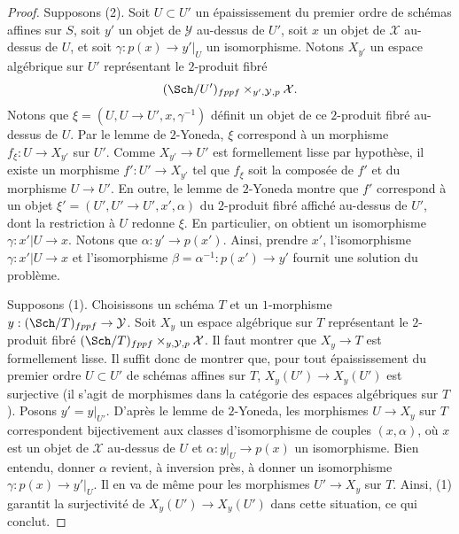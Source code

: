 \begin{proof}
Supposons (2). Soit $U \subset U'$ un épaississement du premier ordre
de schémas affines sur $S$, soit $y'$ un objet de $\mathcal{Y}$
au-dessus de $U'$, soit $x$ un objet de $\mathcal{X}$ au-dessus de $U$,
et soit $\gamma : p(x) \to y'|_U$ un isomorphisme. Notons
$X_{y'}$ un espace algébrique sur $U'$ représentant le $2$-produit
fibré
$$
(\Sch/U')_{fppf} \times_{y', \mathcal{Y}, p} \mathcal{X}.
$$
Notons que $\xi = (U, U \to U', x, \gamma^{-1})$ définit un objet de
ce $2$-produit fibré au-dessus de $U$. Par le lemme de $2$-Yoneda, $\xi$ correspond
à un morphisme $f_\xi : U \to X_{y'}$ sur $U'$. Comme $X_{y'} \to U'$ est
formellement lisse par hypothèse, il existe un morphisme
$f' : U' \to X_{y'}$ tel que $f_\xi$ soit la composée de $f'$
et du morphisme $U \to U'$. En outre, le lemme de $2$-Yoneda montre que
$f'$ correspond à un objet $\xi' = (U', U' \to U', x', \alpha)$ du
$2$-produit fibré affiché au-dessus de $U'$, dont la restriction à
$U$ redonne $\xi$. En particulier, on obtient un isomorphisme
$\gamma : x'|U \to x$. Notons que $\alpha : y' \to p(x')$.
Ainsi, prendre $x'$, l'isomorphisme
$\gamma : x'|U \to x$ et l'isomorphisme
$\beta = \alpha^{-1} : p(x') \to y'$
fournit une solution du problème.

\medskip\noindent
Supposons (1). Choisissons un schéma $T$ et un $1$-morphisme
$y : (\Sch/T)_{fppf} \to \mathcal{Y}$. Soit
$X_y$ un espace algébrique sur $T$ représentant le $2$-produit fibré
$(\Sch/T)_{fppf} \times_{y, \mathcal{Y}, p} \mathcal{X}$.
Il faut montrer que $X_y \to T$ est formellement lisse.
Il suffit donc de montrer que, pour tout épaississement du premier ordre
$U \subset U'$ de schémas affines sur $T$,
$X_y(U') \to X_y(U')$ est surjective (il s'agit de morphismes dans la
catégorie des espaces algébriques sur $T$). Posons $y' = y|_{U'}$.
D'après le lemme de $2$-Yoneda, les morphismes $U \to X_y$ sur $T$ correspondent bijectivement
aux classes d'isomorphisme de couples $(x, \alpha)$, où $x$ est un objet
de $\mathcal{X}$ au-dessus de $U$ et $\alpha : y|_U \to p(x)$ un isomorphisme.
Bien entendu, donner $\alpha$ revient, à inversion près, à donner
un isomorphisme $\gamma : p(x) \to y'|_U$.
Il en va de même pour les morphismes $U' \to X_y$ sur $T$. Ainsi, (1) garantit
la surjectivité de $X_y(U') \to X_y(U')$
dans cette situation, ce qui conclut.
\end{proof}







